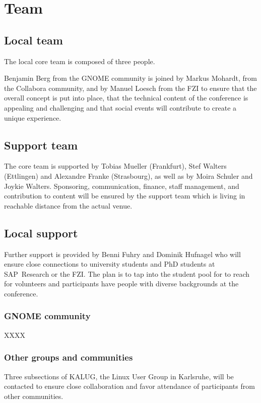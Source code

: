 
\section{Team}

\subsection{Local team}
The local core team is composed of three people.

Benjamin Berg from the GNOME community is joined by Markus Mohardt, from the Collabora community, and by Manuel Loesch from the FZI to ensure that the overall concept is put into place, that the technical content of the conference is appealing and challenging and that social events will contribute to create a unique experience.

\subsection{Support team}

The core team is supported by Tobias Mueller (Frankfurt), Stef Walters (Ettlingen) and Alexandre Franke (Strasbourg), as well as by Moira Schuler and Joykie Walters. Sponsoring, communication, finance, staff management, and contribution to content will be ensured by the support team which is living in reachable distance from the actual venue. 

\subsection{Local support}

Further support is provided by Benni Fuhry and Dominik Hufnagel who will ensure close connections to university students and PhD students at SAP~Research  or the FZI. The plan is to tap into the student pool for to reach for volunteers and participants have people with diverse backgrounds at the conference. 

\subsubsection{GNOME community}

XXXX


\subsubsection{Other groups and communities}

Three subsections of KALUG, the Linux User Group in Karlsruhe, will be contacted to ensure close collaboration and favor attendance of participants from other communities. 


